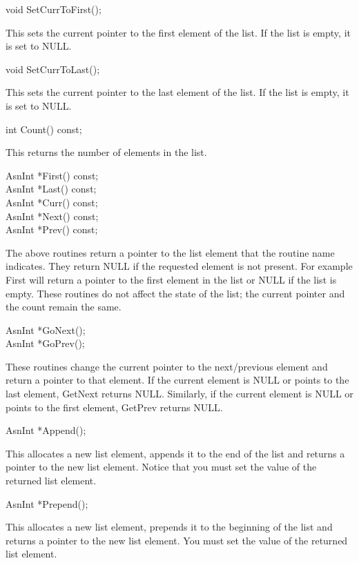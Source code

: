 \begin{Ccode}
void \>\>\>SetCurrToFirst();
\end{Ccode}
This sets the current pointer to the first element of the list. If the
list is empty, it is set to {\C NULL}\@.
\begin{Ccode}
void \>\>\>SetCurrToLast();
\end{Ccode}
This sets the current pointer to the last element of the list. If the
list is empty, it is set to {\C NULL}\@.


\begin{Ccode}
int \>\>\>Count() const;
\end{Ccode}
This returns the number of elements in the list.

\begin{Ccode}
AsnInt \>\>\>*First() const;\\
AsnInt \>\>\>*Last() const;\\
AsnInt \>\>\>*Curr() const;\\
AsnInt \>\>\>*Next() const;\\
AsnInt \>\>\>*Prev() const;
\end{Ccode}
The above routines return a pointer to the list element that the
routine name indicates.  They return {\C NULL} if the requested element is
not present.  For example {\C First} will return a pointer to the
first element in the list or {\C NULL} if the list is empty.  These
routines do not affect the state of the list; the current pointer and
the count remain the same.

\begin{Ccode}
AsnInt \>\>\>*GoNext();\\
AsnInt \>\>\>*GoPrev();
\end{Ccode}
These routines change the current pointer to the next/previous element
and return a pointer to that element.  If the current element is {\C NULL} or
points to the last element, {\C GetNext} returns {\C NULL}\@. Similarly, if
the current element is {\C NULL} or points to the first element, {\C GetPrev}
returns {\C NULL}\@.


\begin{Ccode}
AsnInt \>\>\>*Append();
\end{Ccode}
This allocates a new list element, appends it to the end of the list
and returns a pointer to the new list element.  Notice that you must
set the value of the returned list element.

\begin{Ccode}
AsnInt \>\>\>*Prepend();
\end{Ccode}
This allocates a new list element, prepends it to the beginning of the
list and returns a pointer to the new list element. You must set the
value of the returned list element.

